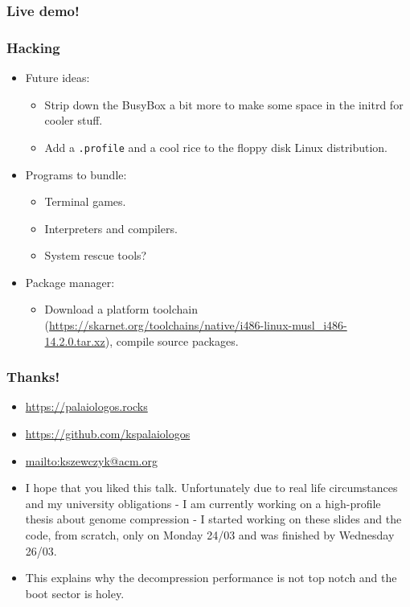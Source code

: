 \documentclass{beamer}
\begin{document}
\begin{frame}
\frametitle{Live demo!}
\end{frame}

\begin{frame}[t,fragile]
\frametitle{Hacking}
\begin{itemize}
  \item Future ideas:
  \begin{itemize}
    \item Strip down the BusyBox a bit more to make some space in the initrd for cooler stuff.
    \item Add a \verb|.profile| and a cool rice to the floppy disk Linux distribution.
  \end{itemize}
  \item Programs to bundle:
  \begin{itemize}
    \item Terminal games.
    \item Interpreters and compilers.
    \item System rescue tools?
  \end{itemize}
  \item Package manager:
  \begin{itemize}
    \item Download a platform toolchain (\url{https://skarnet.org/toolchains/native/i486-linux-musl_i486-14.2.0.tar.xz}), compile source packages.
  \end{itemize}
\end{itemize}
\end{frame}

\begin{frame}
\frametitle{Thanks!}
  \begin{itemize}
    \item \url{https://palaiologos.rocks}
    \item \url{https://github.com/kspalaiologos}
    \item \url{mailto:kszewczyk@acm.org}
    \item I hope that you liked this talk. Unfortunately due to real life circumstances and my university obligations - I am currently working on a high-profile thesis about genome compression - I started working on these slides and the code, from scratch, only on Monday 24/03 and was finished by Wednesday 26/03.
    \item This explains why the decompression performance is not top notch and the boot sector is holey.
  \end{itemize}
\end{frame}
\end{document}

